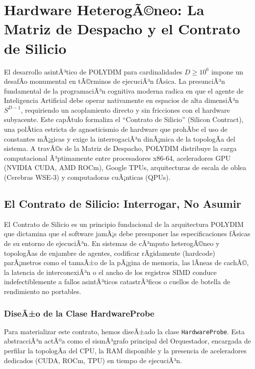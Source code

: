 \chapter{Hardware HeterogÃ©neo: La Matriz de Despacho y el Contrato de Silicio}
\label{cap:hardware_heterogeneo}

El desarrollo asintÃ³tico de POLYDIM para cardinalidades \(D \ge 10^6\) impone un desafÃ­o monumental en tÃ©rminos de ejecuciÃ³n fÃ­sica. La presunciÃ³n fundamental de la programaciÃ³n cognitiva moderna radica en que el agente de Inteligencia Artificial debe operar nativamente en espacios de alta dimensiÃ³n \(S^{D-1}\), requiriendo un acoplamiento directo y sin fricciones con el hardware subyacente. Este capÃ­tulo formaliza el ``Contrato de Silicio'' (Silicon Contract), una polÃ­tica estricta de agnosticismio de hardware que prohÃ­be el uso de constantes mÃ¡gicas y exige la interrogaciÃ³n dinÃ¡mica de la topologÃ­a del sistema. A travÃ©s de la Matriz de Despacho, POLYDIM distribuye la carga computacional Ã³ptimamente entre procesadores x86-64, aceleradores GPU (NVIDIA CUDA, AMD ROCm), Google TPUs, arquitecturas de escala de oblea (Cerebras WSE-3) y computadoras cuÃ¡nticas (QPUs).

\section{El Contrato de Silicio: Interrogar, No Asumir}
\label{sec:silicon_contract}

El Contrato de Silicio es un principio fundacional de la arquitectura POLYDIM que dictamina que el software jamÃ¡s debe presuponer las especificaciones fÃ­sicas de su entorno de ejecuciÃ³n. En sistemas de cÃ³mputo heterogÃ©neo y topologÃ­as de enjambre de agentes, codificar rÃ­gidamente (hardcode) parÃ¡metros como el tamaÃ±o de la pÃ¡gina de memoria, las lÃ­neas de cachÃ©, la latencia de interconexiÃ³n o el ancho de los registros SIMD conduce indefectiblemente a fallos asintÃ³ticos catastrÃ³ficos o cuellos de botella de rendimiento no portables.

\subsection{DiseÃ±o de la Clase HardwareProbe}
Para materializar este contrato, hemos diseÃ±ado la clase \texttt{HardwareProbe}. Esta abstracciÃ³n actÃºa como el sismÃ³grafo principal del Orquestador, encargada de perfilar la topologÃ­a del CPU, la RAM disponible y la presencia de aceleradores dedicados (CUDA, ROCm, TPU) en tiempo de ejecuciÃ³n. 

